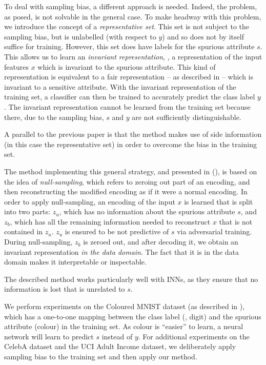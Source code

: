 To deal with sampling bias, a different approach is needed.
Indeed, the problem, as posed, is not solvable in the general case.
To make headway with this problem, we introduce the concept of a \emph{representative set}.
This set is not subject to the sampling bias,
but is unlabelled (with respect to $y$) and so does not by itself suffice for training.
However, this set does have labels for the spurious attribute \(s\).
This allows us to learn an \emph{invariant representation},
\ie, a representation of the input features \(x\) which is invariant to the spurious attribute.
This kind of representation is equivalent to a fair representation -- as described in  --
which is invariant to a sensitive attribute.
With the invariant representation of the training set,
a classifier can then be trained to accurately predict the class label \(y\).
The invariant representation cannot be learned from the training set
because there, due to the sampling bias, \(s\) and \(y\) are not sufficiently distinguishable.

A parallel to the previous paper is that the method makes use of side information
(in this case the representative set)
in order to overcome the bias in the training set.

The method implementing this general strategy, and presented in \citet{kehrenberg2020nullsampling} (),
is based on the idea of \emph{null-sampling},
which refers to zeroing out part of an encoding,
and then reconstructing the modified encoding as if it were a normal encoding.
In order to apply null-sampling, an encoding of the input \(x\) is learned that is split into two parts:
\(z_u\), which has no information about the spurious attribute \(s\),
and \(z_b\), which has all the remaining information needed to reconstruct \(x\) that is not contained in \(z_u\).
\(z_u\) is ensured to be not predictive of \(s\) via adversarial training.
During null-sampling, \(z_b\) is zeroed out, and after decoding it,
we obtain an invariant representation \emph{in the data domain}.
The fact that it is in the data domain makes it interpretable or inspectable.

The described method works particularly well with \acp{INN},
as they ensure that no information is lost that is unrelated to \(s\).

We perform experiments on the Coloured MNIST dataset (as described in ),
which has a one-to-one mapping between the class label (\ie, digit) and the spurious attribute (colour)
in the training set.
As colour is ``easier'' to learn, a neural network will learn to predict \(s\) instead of \(y\).
For additional experiments on the CelebA dataset and the UCI Adult Income dataset,
we deliberately apply sampling bias to the training set and then apply our method.

